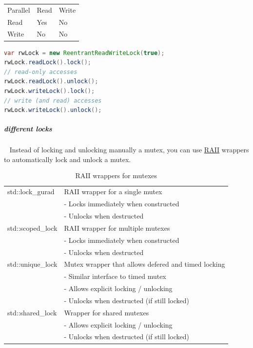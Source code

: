 \documentclass[11pt,twoside,landscape]{article}
\begin{document}
\begin{multicols}{2}
\begin{center}
\begin{tabular}{lll}
Parallel & Read & Write\\[0pt]
Read & Yes & No\\[0pt]
Write & No & No\\[0pt]
\end{tabular}
\end{center}


\begin{lstlisting}[language=java,numbers=none]
var rwLock = new ReentrantReadWriteLock(true);
rwLock.readLock().lock();
// read-only accesses
rwLock.readLock().unlock();
rwLock.writeLock().lock();
// write (and read) accesses
rwLock.writeLock().unlock();
\end{lstlisting}

\subparagraph{different locks} \
\label{sec:org2cda7dc}
Instead of locking and unlocking manually a mutex, you can use \href{../../../roam/20220118172628-resource_acquisition_is_initialization.org}{RAII} wrappers to automatically lock and unlock a mutex.

\begin{table}[htbp]
\caption{\label{tbl:raii-wrappers-for-mutexes}RAII wrappers for mutexes}
\centering
\begin{tabular}{|l|l|}
\hline
std::lock\_gurad & RAII wrapper for a single mutex \\
 & - Locks immediately when constructed \\
 & - Unlocks when destructed \\
\hline
std::scoped\_lock & RAII wrapper for multiple mutexes \\
 & - Locks immediately when constructed \\
 & - Unlocks when destructed \\
\hline
std::unique\_lock & Mutex wrapper that allows defered and timed locking \\
 & - Similar interface to timed mutex \\
 & - Allows explicit locking / unlocking \\
 & - Unlocks when destructed (if still locked) \\
\hline
std::shared\_lock & Wrapper for shared mutexes \\
 & - Allows explicit locking / unlocking \\
 & - Unlocks when destructed (if still locked) \\
\hline
\end{tabular}
\end{table}



\end{multicols}
\end{document}
